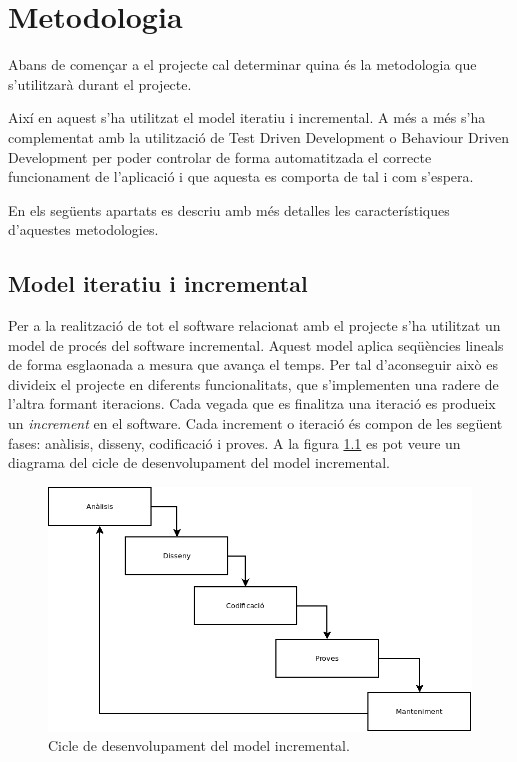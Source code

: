 \chapter{Metodologia}
\label{chap:metodologia}

Abans de començar a el projecte cal determinar quina és la metodologia que s'utilitzarà durant el projecte. 

Així en aquest s'ha utilitzat el model iteratiu i incremental. A més a més s'ha complementat amb la utilització de Test Driven Development o Behaviour Driven Development per poder controlar de forma automatitzada el correcte funcionament de l'aplicació i que aquesta es comporta de tal i com s'espera.

En els següents apartats es descriu amb més detalles les característiques d'aquestes metodologies.  

\section{Model iteratiu i incremental}

Per a la realització de tot el software relacionat amb el projecte s’ha utilitzat un model de procés del software incremental. Aquest model aplica seqüències lineals de forma esglaonada a mesura que avança el temps. Per tal d'aconseguir això es divideix el projecte en diferents funcionalitats, que s'implementen una radere de l'altra formant iteracions. Cada vegada que es finalitza una iteració es produeix un \emph{increment} en el software. Cada increment o iteració és compon de les següent fases: anàlisis, disseny, codificació i proves. A la figura \ref{fig:mii} es pot veure un diagrama del cicle de desenvolupament del model incremental.

\begin{figure}[htbp]
\centering\includegraphics[width=12cm]{img/model-incremental.png}
\caption{Cicle de desenvolupament del model incremental.}
\label{fig:mii}
\end{figure} 

